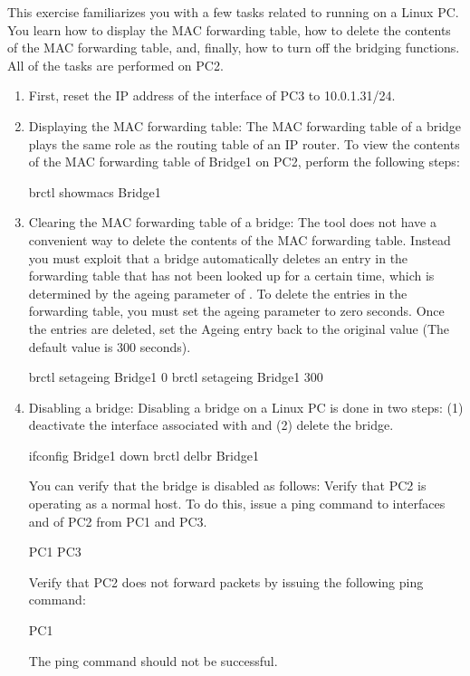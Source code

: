 This exercise familiarizes you with a few tasks related to running  on a Linux PC. You learn how to display the MAC forwarding table, how to delete the contents of the MAC forwarding table, and, finally, how to turn off the bridging functions. All of the tasks are performed on PC2.
\begin{enumerate}
	\item First, reset the IP address of the  interface of PC3 to 10.0.1.31/24.
	\item Displaying the MAC forwarding table: The MAC forwarding table of a bridge plays the same role as the routing table of an IP router. To view the contents of the MAC forwarding table of Bridge1 on PC2, perform the following steps:
		\begin{cmdblock}
	brctl showmacs Bridge1
		\end{cmdblock}
	\item Clearing the MAC forwarding table of a bridge: The  tool does not have a convenient way to delete the contents of the MAC forwarding table. Instead you must exploit that a bridge automatically deletes an entry in the forwarding table that has not been looked up for a certain time, which is determined by the ageing parameter of . To delete the entries in the forwarding table, you must set the ageing parameter to zero seconds. Once the entries are deleted, set the Ageing entry back to the original value (The default value is 300 seconds).
		\begin{cmdblock}
	brctl setageing Bridge1 0
	brctl setageing Bridge1 300
		\end{cmdblock}
	\item Disabling a bridge: Disabling a bridge on a Linux PC is done in two steps: (1) deactivate the interface associated with  and (2) delete the bridge.
		\begin{cmdblock}
	ifconfig Bridge1 down
	brctl delbr Bridge1
		\end{cmdblock}
		You can verify that the bridge is disabled as follows: Verify that PC2 is operating as a normal host. To do this, issue a ping command to interfaces  and  of PC2 from PC1 and PC3. 
		\begin{cmdblock}
	PC1%
	PC3%
		\end{cmdblock}
		Verify that PC2 does not forward packets by issuing the following ping command:
		\begin{cmdblock}
	PC1%
		\end{cmdblock}
		The ping command should not be successful.
\end{enumerate}


